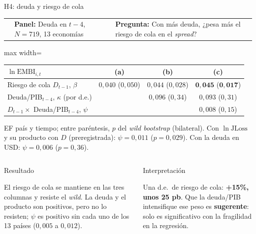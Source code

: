 \documentclass[aspectratio=169]{beamer}
\makeatletter
\newcommand{\JLoss}{\mathrm{JLoss}}
\newcommand{\EMBI}{\mathrm{EMBI}}
\newcommand{\franja}[3]{\par\vspace{-6pt}\noindent
\colorbox{tesisblue!10}{\begin{minipage}{\dimexpr\textwidth-2\fboxsep\relax}\scriptsize
\begin{tabular}{@{}>{\raggedright\arraybackslash}p{0.13\textwidth}@{\hspace{8pt}}>{\raggedright\arraybackslash}p{0.25\textwidth}@{\hspace{8pt}}>{\raggedright\arraybackslash}p{0.52\textwidth}@{}}
{\color{tesisblue}\bfseries Ecuación #1} & \textbf{Panel:} #2 & \textbf{Pregunta:} #3
\end{tabular}\end{minipage}}\par\vspace{4pt}}
\newcommand{\cajas}[2]{\par\vspace{4pt}
\begin{columns}[T]
\column{0.49\textwidth}
\begin{block}{Resultado}\scriptsize\raggedright #1\end{block}
\column{0.49\textwidth}
\begin{exampleblock}{Interpretación}\scriptsize\raggedright #2\end{exampleblock}
\end{columns}}
\makeatother
\begin{document}
\begin{frame}{H4: deuda y riesgo de cola}
\franja{(4)}{Deuda en $t-4$, $N=719$, 13 economías}{Con más deuda, ¿pesa más el riesgo de cola en el \textit{spread}?}
\centering
\footnotesize
\begin{adjustbox}{max width=\textwidth}
\begin{tabular}{l ccc}
\toprule
$\ln\EMBI_{i,t}$ & (a) & (b) & (c) \\
\midrule
Riesgo de cola $D_{t-1}$, $\beta$ & $0{,}040$ \;($0{,}050$) & $0{,}044$ \;($0{,}028$) & $\mathbf{0{,}045}$ \;($\mathbf{0{,}017}$) \\
Deuda/PIB$_{t-4}$, $\kappa$ (por d.e.) & & $0{,}096$ \;($0{,}34$) & $0{,}093$ \;($0{,}31$) \\
$D_{t-1}\times$ Deuda/PIB$_{t-4}$, $\psi$ & & & $0{,}008$ \;($0{,}15$) \\
\bottomrule
\end{tabular}
\end{adjustbox}

{\scriptsize\raggedright EF país y tiempo; entre paréntesis, $p$ del \textit{wild bootstrap} (bilateral). Con $\ln\JLoss$ y su producto con $D$ (preregistrada): $\psi=0{,}011$ ($p=0{,}029$). Con la deuda en USD: $\psi=0{,}006$ ($p=0{,}36$).\par}
\vspace{-6pt}
\cajas{El riesgo de cola se mantiene en las tres columnas y resiste el \textit{wild}. La deuda y el producto son positivos, pero no lo resisten; $\psi$ es positivo sin cada uno de los 13 países ($0{,}005$ a $0{,}012$).}
{Una d.e.\ de riesgo de cola: \textbf{+15\%, unos 25 pb}. Que la deuda/PIB intensifique ese peso es \textbf{sugerente}: solo es significativo con la fragilidad en la regresión.}
\end{frame}
\end{document}
